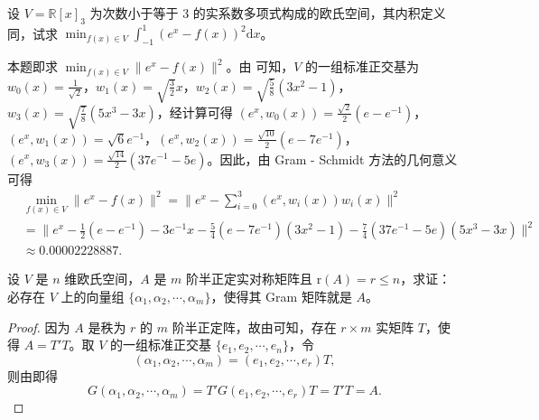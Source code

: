 \documentclass[../../main.tex]{subfiles}%
\begin{document}
\begin{example}
设 $V = \mathbb{R}[x]_3$ 为次数小于等于 3 的实系数多项式构成的欧氏空间，其内积定义同，试求 $\min_{f(x)\in V}\int_{-1}^{1}(e^x - f(x))^2\mathrm{d}x$。
\end{example}
\begin{solution}
本题即求 $\min_{f(x)\in V}\|e^x - f(x)\|^2$。由 可知，$V$ 的一组标准正交基为
$w_0(x)=\frac{1}{\sqrt{2}}$，$w_1(x)=\sqrt{\frac{3}{2}}x$，$w_2(x)=\sqrt{\frac{5}{8}}(3x^2 - 1)$，$w_3(x)=\sqrt{\frac{7}{8}}(5x^3 - 3x)$，经计算可得 $(e^x,w_0(x))=\frac{\sqrt{2}}{2}(e - e^{-1})$，$(e^x,w_1(x))=\sqrt{6}e^{-1}$，$(e^x,w_2(x))=\frac{\sqrt{10}}{2}(e - 7e^{-1})$，$(e^x,w_3(x))=\frac{\sqrt{14}}{2}(37e^{-1} - 5e)$。因此，由 Gram - Schmidt 方法的几何意义可得
\begin{align*}
&\min_{f(x)\in V}\|e^x - f(x)\|^2=\|e^x - \sum_{i = 0}^{3}(e^x,w_i(x))w_i(x)\|^2\\
&=\|e^x - \frac{1}{2}(e - e^{-1}) - 3e^{-1}x - \frac{5}{4}(e - 7e^{-1})(3x^2 - 1) - \frac{7}{4}(37e^{-1} - 5e)(5x^3 - 3x)\|^2\\
&\approx 0.00002228887.
\end{align*}

\end{solution}

\begin{proposition}\label{proposition:例9.14}
设 $V$ 是 $n$ 维欧氏空间，$A$ 是 $m$ 阶半正定实对称矩阵且 $\mathrm{r}(A)=r\leqslant  n$，求证：必存在 $V$ 上的向量组 $\{\alpha_1,\alpha_2,\cdots,\alpha_m\}$，使得其 Gram 矩阵就是 $A$。
\end{proposition}
\begin{proof}
因为 $A$ 是秩为 $r$ 的 $m$ 阶半正定阵，故由可知，存在 $r\times m$ 实矩阵 $T$，使得 $A = T'T$。取 $V$ 的一组标准正交基 $\{e_1,e_2,\cdots,e_n\}$，令
\[
(\alpha_1,\alpha_2,\cdots,\alpha_m)=(e_1,e_2,\cdots,e_r)T,
\]
则由即得
\[
G(\alpha_1,\alpha_2,\cdots,\alpha_m)=T'G(e_1,e_2,\cdots,e_r)T=T'T = A.
\]
\end{proof}
\end{document}
